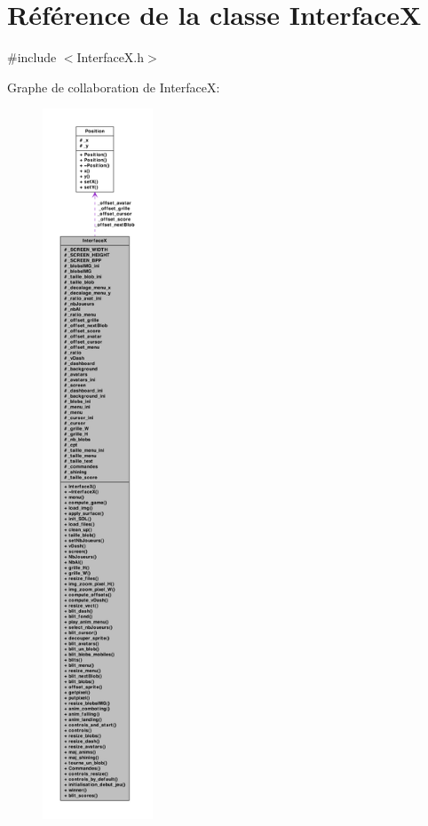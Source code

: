 \hypertarget{a00011}{
\section{Référence de la classe InterfaceX}
\label{a00011}
}


{\ttfamily \#include $<$InterfaceX.h$>$}



Graphe de collaboration de InterfaceX:
\nopagebreak
\begin{figure}[H]
\begin{center}
\leavevmode
\includegraphics[height=600pt]{a00089}
\end{center}
\end{figure}
